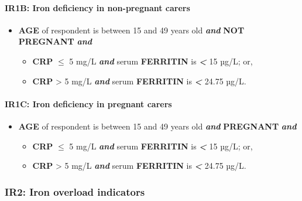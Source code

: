 \documentclass[12pt,a4paper]{article}
\let\oldparagraph\paragraph
\renewcommand{\paragraph}[1]{\oldparagraph{#1}\mbox{}}
\begin{document}
\hypertarget{ir1b-iron-deficiency-in-non-pregnant-carers}{%
\paragraph{IR1B: Iron deficiency in non-pregnant carers}\label{ir1b-iron-deficiency-in-non-pregnant-carers}}

\begin{itemize}
\item
  \textbf{AGE} of respondent is between 15 and 49 years old \textbf{\emph{and}} \textbf{NOT PREGNANT} \textbf{\emph{and}}

  \begin{itemize}
  \item
    \textbf{CRP} \textbf{\emph{\(\leq\)}} 5 mg/L \textbf{\emph{and}} serum \textbf{FERRITIN} is \textbf{\emph{\textless{}}} 15 µg/L; or,
  \item
    \textbf{CRP} \textgreater{} 5 mg/L \textbf{\emph{and}} serum \textbf{FERRITIN} is \textbf{\emph{\textless{}}} 24.75 µg/L.
  \end{itemize}
\end{itemize}

\hypertarget{ir1c-iron-deficiency-in-pregnant-carers}{%
\paragraph{IR1C: Iron deficiency in pregnant carers}\label{ir1c-iron-deficiency-in-pregnant-carers}}

\begin{itemize}
\item
  \textbf{AGE} of respondent is between 15 and 49 years old \textbf{\emph{and}} \textbf{PREGNANT} \textbf{\emph{and}}

  \begin{itemize}
  \item
    \textbf{CRP} \textbf{\emph{\(\leq\)}} 5 mg/L \textbf{\emph{and}} serum \textbf{FERRITIN} is \textbf{\emph{\textless{}}} 15 µg/L; or,
  \item
    \textbf{CRP} \textgreater{} 5 mg/L \textbf{\emph{and}} serum \textbf{FERRITIN} is \textbf{\emph{\textless{}}} 24.75 µg/L.
  \end{itemize}
\end{itemize}

\hypertarget{ir2-iron-overload-indicators}{%
\subsubsection{IR2: Iron overload indicators}\label{ir2-iron-overload-indicators}}
\end{document}

